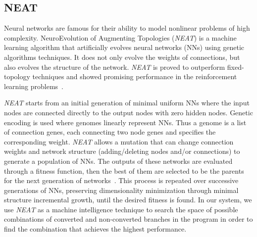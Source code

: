 \documentclass[preprint,nocopyrightspace]{sigplanconf}
\begin{document}
\subsection{NEAT}
\label{neat}
Neural networks are famous for their ability to model nonlinear problems of high complexity. NeuroEvolution of Augmenting Topologies (\textit{NEAT}) is a machine learning algorithm that artificially evolves neural networks (NNs) using genetic algorithms techniques. It does not only evolve the weights of connections, but also evolves the structure of the network. \textit{ NEAT} is proved to outperform fixed-topology techniques and showed promising performance in the reinforcement learning problems~\cite{stanley:ec02}. 

\textit{NEAT} starts from an initial generation of minimal uniform NNs where the input nodes are connected directly to the output nodes with zero hidden nodes.  Genetic encoding is used where genomes linearly represent NNs. Thus a genome is a list of connection genes, each connecting two node genes and specifies the corresponding weight. \textit{NEAT} allows a mutation that can change connection weights and network structure (adding/deleting nodes and/or connections) to generate a population of NNs. The outputs of these networks are evaluated through a fitness function, then the best of them are selected to be the parents for the next generation of networks~\cite{stanley1996efficient}. This process is repeated over successive generations of NNs, preserving dimensionality minimization through minimal structure incremental growth, until the desired fitness is found. In our system, we use \textit{NEAT} as a machine intelligence technique to search the space of  possible combinations of converted and non-converted  branches in the program in order to find the combination that achieves the highest performance. 
\end{document}
